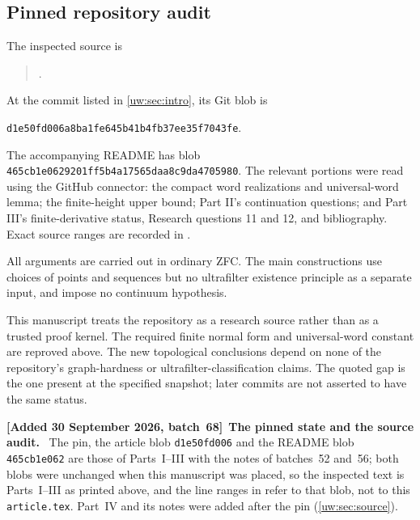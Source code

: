 \documentclass[11pt,letterpaper]{article}
\numberwithin{equation}{section}
\theoremstyle{definition}
\theoremstyle{remark}
\theoremstyle{definition}
\newenvironment{writenotee}[1][]{\par\smallskip\begingroup\small\sloppy
 \noindent\textbf{[Added 30 September 2026, batch~68]}\if\relax\detokenize{#1}\relax\else~\textbf{#1.}\fi\ }%
 {\par\endgroup\smallskip}
\begin{document}
\subsection{Pinned repository audit}
The inspected source is
\begin{quote}\small\raggedright
{}\allowbreak
{}.
\end{quote}
At the commit listed in \cref{uw:sec:intro}, its Git blob is
\begin{center}
\texttt{d1e50fd006a8ba1fe645b41b4fb37ee35f7043fe}.
\end{center}
The accompanying README has blob
\texttt{465cb1e0629201ff5b4a17565daa8c9da4705980}.
The relevant portions were read using the GitHub connector: the compact
word realizations and universal-word lemma; the finite-height upper bound;
Part II's continuation questions; and Part III's finite-derivative status,
Research questions 11 and 12, and bibliography. Exact source ranges are
recorded in .

All arguments are carried out in ordinary ZFC. The main constructions use
choices of points and sequences but no ultrafilter existence principle as a
separate input, and impose no continuum hypothesis.

This manuscript treats the repository as a research source rather than as a
trusted proof kernel. The required finite normal form and universal-word
constant are reproved above. The new topological conclusions depend on none
of the repository's graph-hardness or ultrafilter-classification claims.
The quoted gap is the one present at the specified snapshot; later commits
are not asserted to have the same status.

\begin{writenotee}[The pinned state and the source audit]
The pin, the article blob \texttt{d1e50fd006} and the README blob
\texttt{465cb1e062} are those of Parts~I--III with the notes of
batches~52 and~56; both blobs were unchanged when this manuscript was
placed, so the inspected text is Parts~I--III as printed above, and the
line ranges in  refer to that blob, not
to this \texttt{article.tex}. Part~IV and its notes were added after the
pin (\cref{uw:sec:source}).
\end{writenotee}
\end{document}

